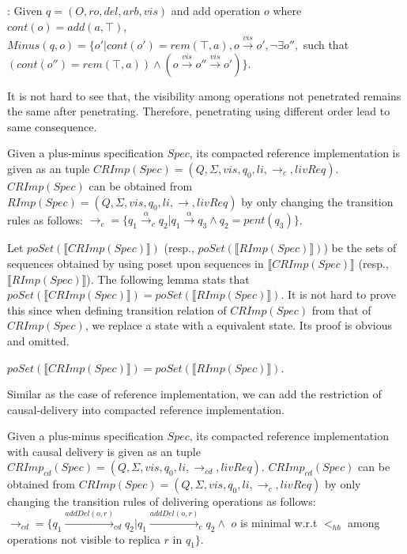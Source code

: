 : Given $q=(O,ro,del,arb,vis)$ and add operation $o$ where $cont(o)=add(a,\top)$, $Minus(q,o) = \{o' \vert cont(o')=rem(\top,a), o {\xrightarrow{vis}} o', \neg \exists o'',$ such that $( cont(o'') = rem(\top,a) ) \wedge ( o {\xrightarrow{vis}} o'' {\xrightarrow{vis}} o' ) \}$.









It is not hard to see that, the visibility among operations not penetrated remains the same after penetrating. Therefore, penetrating using different order lead to same consequence.

Given a plus-minus specification $Spec$, its compacted reference implementation is given as an tuple $CRImp(Spec) = (Q,\Sigma,vis,q_0,li,\rightarrow_c,livReq)$. $CRImp(Spec)$ can be obtained from $RImp(Spec) = (Q,\Sigma,vis,q_0,li,\rightarrow,livReq)$ by only changing the transition rules as follows:  $\rightarrow_c = \{ q_1 {\xrightarrow{\alpha}}_c q_2 \vert q_1 {\xrightarrow{\alpha}} q_3 \wedge q_2 = pent(q_3) \}$.

Let $poSet(\llbracket CRImp(Spec) \rrbracket)$ (resp., $poSet(\llbracket RImp(Spec) \rrbracket)$) be the sets of sequences obtained by using poset upon sequences in $\llbracket CRImp(Spec) \rrbracket$ (resp., $\llbracket RImp(Spec) \rrbracket$). The following lemma stats that $poSet(\llbracket CRImp(Spec) \rrbracket) = poSet(\llbracket RImp(Spec) \rrbracket)$. It is not hard to prove this since when defining transition relation of $CRImp(Spec)$ from that of $CRImp(Spec)$, we replace a state with a equivalent state. Its proof is obvious and omitted.

\begin{lemma}
\label{lemma:CRImpcdSpec and RImpcdSpec contain the same set of trace}
$poSet(\llbracket CRImp(Spec) \rrbracket) = poSet(\llbracket RImp(Spec) \rrbracket)$.
\end{lemma}

Similar as the case of reference implementation, we can add the restriction of causal-delivery into compacted reference implementation.

Given a plus-minus specification $Spec$, its compacted reference implementation with causal delivery is given as an tuple $CRImp_{cd}(Spec) = (Q,\Sigma,vis,q_0,li,\rightarrow_{cd},livReq)$. $CRImp_{cd}(Spec)$ can be obtained from $CRImp(Spec) = (Q,\Sigma,vis,q_0,li,\rightarrow_c,livReq)$ by only changing the transition rules of delivering operations as follows: $\rightarrow_{cd} = \{ q_1 {\xrightarrow{addDel(o,r)}}_{cd} q_2 \vert q_1 {\xrightarrow{addDel(o,r)}}_c q_2 \wedge$ $o$ is minimal w.r.t $<_{hb}$ among operations not visible to replica $r$ in $q_1 \}$.


